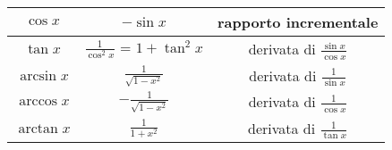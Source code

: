 \documentclass[a4paper,12pt, oneside]{book}
\begin{document}
{\begin{tabular}{|c|c|c|}
		\hline
		$\cos x$                                                                                                       & $-\sin x$                                 & rapporto incrementale               \\[1ex]
		\hline
		$\tan x$                                                                                                       & $\frac{1}{\cos^2 x}\mbox{ = } 1+\tan^2 x$ & derivata di $\frac{\sin x}{\cos x}$ \\[1ex]
		\hline
		$\arcsin x$                                                                                                    & $\frac{1}{\sqrt{1-x^2}}$                  & derivata di $\frac{1}{\sin x}$      \\[1ex]
		\hline
		$\arccos x$                                                                                                    & $-\frac{1}{\sqrt{1-x^2}}$                 & derivata di $\frac{1}{\cos x}$      \\[1ex]
		\hline
		$\arctan x$                                                                                                    & $\frac{1}{1+x^2}$                         & derivata di $\frac{1}{\tan x}$      \\[1ex]
		\hline
	\end{tabular}
}
\newpage
\end{document}

